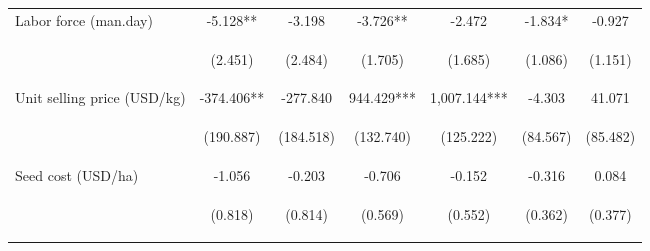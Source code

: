 \begin{center}
\begin{tabular}{lcccccc}
Labor force (man.day) & -5.128** & -3.198 & -3.726** & -2.472 & -1.834* & -0.927 \\
\vspace{4pt} & \begin{footnotesize}(2.451)\end{footnotesize} & \begin{footnotesize}(2.484)\end{footnotesize} & \begin{footnotesize}(1.705)\end{footnotesize} & \begin{footnotesize}(1.685)\end{footnotesize} & \begin{footnotesize}(1.086)\end{footnotesize} & \begin{footnotesize}(1.151)\end{footnotesize} \\
Unit selling price (USD/kg) & -374.406** & -277.840 & 944.429*** & 1,007.144*** & -4.303 & 41.071 \\
\vspace{4pt} & \begin{footnotesize}(190.887)\end{footnotesize} & \begin{footnotesize}(184.518)\end{footnotesize} & \begin{footnotesize}(132.740)\end{footnotesize} & \begin{footnotesize}(125.222)\end{footnotesize} & \begin{footnotesize}(84.567)\end{footnotesize} & \begin{footnotesize}(85.482)\end{footnotesize} \\
Seed cost (USD/ha) & -1.056 & -0.203 & -0.706 & -0.152 & -0.316 & 0.084 \\
\vspace{4pt} & \begin{footnotesize}(0.818)\end{footnotesize} & \begin{footnotesize}(0.814)\end{footnotesize} & \begin{footnotesize}(0.569)\end{footnotesize} & \begin{footnotesize}(0.552)\end{footnotesize} & \begin{footnotesize}(0.362)\end{footnotesize} & \begin{footnotesize}(0.377)\end{footnotesize} \\

\end{tabular}
\end{center}
